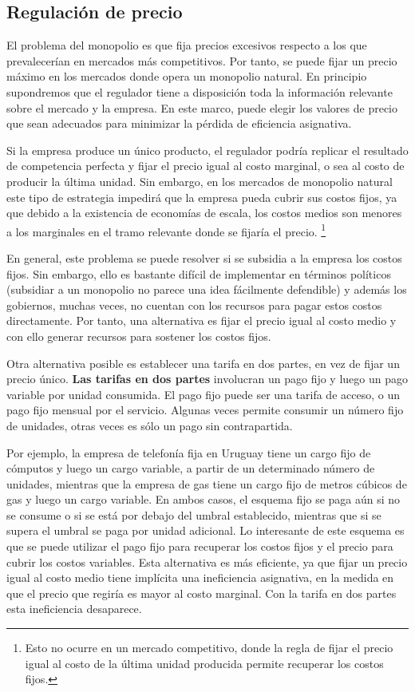 \documentclass[
  12pt,
  spanish,
]{book}
\begin{document}
\hypertarget{regulaciuxf3n-de-precio}{%
\subsection{Regulación de precio}\label{regulaciuxf3n-de-precio}}

El problema del monopolio es que fija precios excesivos respecto a los que prevalecerían en mercados más competitivos. Por tanto, se puede fijar un precio máximo en los mercados donde opera un monopolio natural. En principio supondremos que el regulador tiene a disposición toda la información relevante sobre el mercado y la empresa. En este marco, puede elegir los valores de precio que sean adecuados para minimizar la pérdida de eficiencia asignativa.

Si la empresa produce un único producto, el regulador podría replicar el resultado de competencia perfecta y fijar el precio igual al costo marginal, o sea al costo de producir la última unidad. Sin embargo, en los mercados de monopolio natural este tipo de estrategia impedirá que la empresa pueda cubrir sus costos fijos, ya que debido a la existencia de economías de escala, los costos medios son menores a los marginales en el tramo relevante donde se fijaría el precio.
\footnote{Esto no ocurre en un mercado competitivo, donde la regla de fijar el precio igual al costo de la última unidad producida permite recuperar los costos fijos.}

En general, este problema se puede resolver si se subsidia a la empresa los costos fijos. Sin embargo, ello es bastante difícil de implementar en términos políticos (subsidiar a un monopolio no parece una idea fácilmente defendible) y además los gobiernos, muchas veces, no cuentan con los recursos para pagar estos costos directamente. Por tanto, una alternativa es fijar el precio igual al costo medio y con ello generar recursos para sostener los costos fijos.

Otra alternativa posible es establecer una tarifa en dos partes, en vez de fijar un precio único. \textbf{Las tarifas en dos partes} involucran un pago fijo y luego un pago variable por unidad consumida. El pago fijo puede ser una tarifa de acceso, o un pago fijo mensual por el servicio. Algunas veces permite consumir un número fijo de unidades, otras veces es sólo un pago sin contrapartida.

Por ejemplo, la empresa de telefonía fija en Uruguay tiene un cargo fijo de cómputos y luego un cargo variable, a partir de un determinado número de unidades, mientras que la empresa de gas tiene un cargo fijo de metros cúbicos de gas y luego un cargo variable. En ambos casos, el esquema fijo se paga aún si no se consume o si se está por debajo del umbral establecido, mientras que si se supera el umbral se paga por unidad adicional. Lo interesante de este esquema es que se puede utilizar el pago fijo para recuperar los costos fijos y el precio para cubrir los costos variables. Esta alternativa es más eficiente, ya que fijar un precio igual al costo medio tiene implícita una ineficiencia asignativa, en la medida en que el precio que regiría es mayor al costo marginal. Con la tarifa en dos partes esta ineficiencia desaparece.
\end{document}
